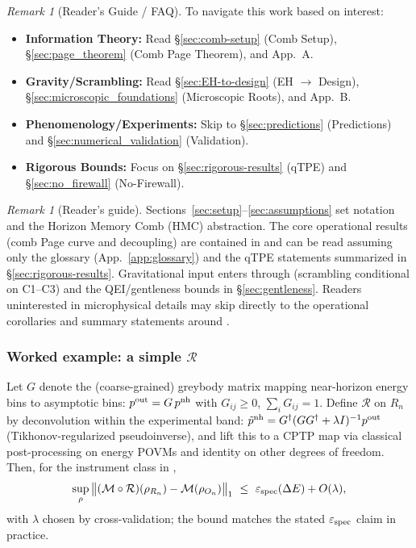 \documentclass[11pt,a4paper]{article}
\theoremstyle{plain}
\theoremstyle{definition}
\theoremstyle{remark}
\newtheorem{remark}[theorem]{Remark}
\begin{document}
\begin{remark}[Reader's Guide / FAQ]
To navigate this work based on interest:
\begin{itemize}[leftmargin=*,itemsep=0pt]
    \item \textbf{Information Theory:} Read \S\ref{sec:comb-setup} (Comb Setup), \S\ref{sec:page_theorem} (Comb Page Theorem), and App.~A.
    \item \textbf{Gravity/Scrambling:} Read \S\ref{sec:EH-to-design} (EH $\to$ Design), \S\ref{sec:microscopic_foundations} (Microscopic Roots), and App.~B.
    \item \textbf{Phenomenology/Experiments:} Skip to \S\ref{sec:predictions} (Predictions) and \S\ref{sec:numerical_validation} (Validation).
    \item \textbf{Rigorous Bounds:} Focus on \S\ref{sec:rigorous-results} (qTPE) and \S\ref{sec:no_firewall} (No-Firewall).
\end{itemize}
\end{remark}

\begin{remark}[Reader's guide]\label{rem:readers-guide}
Sections~\ref{sec:setup}--\ref{sec:assumptions} set notation and the Horizon Memory Comb (HMC) abstraction. The core operational results (comb Page curve and decoupling) are contained in  and can be read assuming only the glossary (App.~\ref{app:glossary}) and the qTPE statements summarized in \S\ref{sec:rigorous-results}. Gravitational input enters through  (scrambling conditional on C1--C3) and the QEI/gentleness bounds in \S\ref{sec:gentleness}. Readers uninterested in microphysical details may skip directly to the operational corollaries and summary statements around .
\end{remark}

\subsubsection{Worked example: a simple $\mathcal{R}$}
Let $G$ denote the (coarse-grained) greybody matrix mapping near-horizon energy bins to asymptotic bins:
$p^{\rm out} = G\,p^{\rm nh}$ with $G_{ij}\ge 0$, $\sum_i G_{ij}=1$.
Define $\mathcal{R}$ on $R_n$ by deconvolution within the experimental band:
$\tilde p^{\rm nh} = G^{\dagger}(G G^{\dagger}+\lambda I)^{-1} p^{\rm out}$ (Tikhonov-regularized pseudoinverse),
and lift this to a CPTP map via classical post-processing on energy POVMs and identity on other degrees of freedom.
Then, for the instrument class in ,
\begin{equation*}
\sup_\rho \big\|(\mathcal{M}\circ\mathcal{R})(\rho_{R_n})-\mathcal{M}(\rho_{O_n})\big\|_1
\ \le\ \varepsilon_{\rm spec}(\Delta E) + O(\lambda),
\end{equation*}
with $\lambda$ chosen by cross-validation; the bound matches the stated $\varepsilon_{\rm spec}$ claim in practice.
\end{document}
